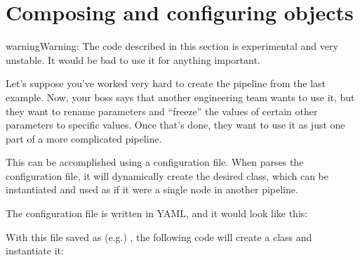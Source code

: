\documentclass[letterpaper,10pt,english]{sphinxmanual}
\begin{document}
\section{Composing and configuring  objects}
\label{\detokenize{overview:composing-and-configuring-nanonode-objects}}
\begin{sphinxadmonition}{warning}{Warning:}
The code described in this section is experimental and very
unstable. It would be bad to use it for anything important.
\end{sphinxadmonition}

Let’s suppose you’ve worked very hard to create the pipeline from the
last example. Now, your boss says that another engineering team wants to
use it, but they want to rename parameters and “freeze” the values of
certain other parameters to specific values. Once that’s done, they want
to use it as just one part of a more complicated 
pipeline.

This can be accomplished using a configuration file. When 
parses the configuration file, it will dynamically create the desired
class, which can be instantiated and used as if it were a single node in
another pipeline.

The configuration file is written in YAML, and it would look like this:

%
\begin{sphinxVerbatim}[commandchars=\\\{\}]
 

    
     
       
       
    
     
     
\end{sphinxVerbatim}

With this file saved as (e.g.) , the following code
will create a  class and instantiate it:
\end{document}
